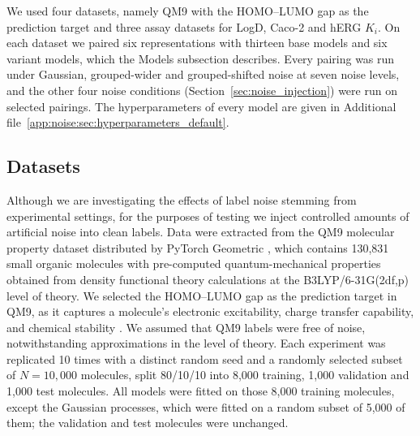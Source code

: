 We used four datasets, namely QM9 with the HOMO--LUMO gap as the prediction target and three assay datasets for LogD, Caco-2 and hERG $K_i$. On each dataset we paired six representations with thirteen base models and six variant models, which the Models subsection describes. Every pairing was run under Gaussian, grouped-wider and grouped-shifted noise at seven noise levels, and the other four noise conditions (Section~\ref{sec:noise_injection}) were run on selected pairings. The hyperparameters of every model are given in Additional file~\ref{app:noise:sec:hyperparameters_default}.



\subsection{Datasets}

Although we are investigating the effects of label noise stemming from experimental settings, for the purposes of testing we inject controlled amounts of artificial noise into clean labels. Data were extracted from the QM9 molecular property dataset distributed by PyTorch Geometric \citep{Ramakrishnan2014}, which contains 130,831 small organic molecules with pre-computed quantum-mechanical properties obtained from density functional theory calculations at the B3LYP/6-31G(2df,p) level of theory. We selected the HOMO--LUMO gap as the prediction target in QM9, as it captures a molecule's electronic excitability, charge transfer capability, and chemical stability \citep{Fediai2023}. We assumed that QM9 labels were free of noise, notwithstanding approximations in the level of theory. Each experiment was replicated 10 times with a distinct random seed and a randomly selected subset of $N = 10{,}000$ molecules, split 80/10/10 into 8,000 training, 1,000 validation and 1,000 test molecules. All models were fitted on those 8,000 training molecules, except the Gaussian processes, which were fitted on a random subset of 5,000 of them; the validation and test molecules were unchanged.

